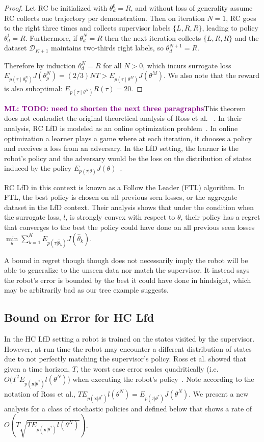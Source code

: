 \documentclass[10pt, conference]{ieeeconf}      %
\newcommand{\bx}{\mathbf{x}}
\newcommand{\mD}{\mathcal{D}}
\newcommand{\mlnote}[1]{\ifthenelse{ \boolean{include-notes}}%
 {\textcolor{purple}{\textbf{ML: #1}}}{}}
\begin{document}
\begin{proof}
Let RC be initialized with $\theta_d^0 = R$, and without loss of generality assume RC collects one trajectory per demonstration.
Then on iteration $N=1$, RC goes to the right three times and collects supervisor labels $\{L, R, R\}$, leading to policy $\theta_{d}^1 = R$.
Furthermore, if $\theta_{d}^N = R$ then the next iteration collects $\{L, R, R\}$ and the dataset $\mD_{K+1}$ maintains two-thirds right labels, so $\theta_{d}^{N+1} = R$.

Therefore by induction $\theta_{d}^{N} = R$ for all $N > 0$, which incurs surrogate loss $E_{p(\tau \mid \theta_{p}^N)} J(\theta_{p}^N) = (2 / 3) N T > E_{p(\tau \mid \theta^M)} J(\theta^M)$.
We also note that the reward is also suboptimal: $E_{p(\tau \mid \theta^N)} R(\tau) = 20$.

\end{proof}

\mlnote{TODO: need to shorten the next three paragraphs}This theorem does not contradict the original theoretical analysis of Ross et al. ~\cite{ross2010reduction}. In their analysis, RC LfD is modeled as an online optimization problem~\cite{ross2010reduction}.  In online optimization a learner plays a game where at each iteration, it chooses a policy and receives a loss from an adversary.  In the LfD setting, the learner is the robot's policy and the adversary would be the loss on the distribution of states induced by the policy $E_{p(\tau|\theta)} J(\theta)$~\cite{shalev2011online}.

RC LfD in this context is known as a Follow the Leader (FTL) algorithm. In FTL, the best policy is chosen on all previous seen losses, or the aggregate dataset in the LfD context. Their analysis shows that under the condition when the surrogate loss, $l$, is strongly convex with respect to $\theta$, their policy has a regret that converges to the best the policy could have done on all previous seen losses $\underset{\theta}{\min} \sum_{k=1}^K E_{p(\tau|\hat{\theta}_k)}J(\hat{\theta}_k)$. 

A bound in regret though though does not necessarily imply the robot will be able to generalize to the unseen data nor match the supervisor. It instead says the robot's error is bounded by the best it could have done in hindsight, which may be arbitrarily bad as our tree example suggests. 

\subsection{Bound on Error for HC Lfd}
In the HC LfD setting a robot is trained on the states visited by the supervisor. However, at run time the robot may encounter a different distribution of states due to not perfectly matching the supervisor's policy. Ross et al. showed that given a time horizon, $T$, the worst case error scales quadritically (i.e. $O(T^2E_{p(\bx|\theta^*)} l(\theta^N)$) when executing the robot's policy~\cite{ross2010efficient}. Note according to the notation of Ross et al., $TE_{p(\bx|\theta^*)} l(\theta^N) = E_{p(\tau|\theta^*)} J(\theta^N)$. We present a new analysis for a class of stochastic policies and  defined below that shows a rate of $O(T\sqrt{TE_{p(\bx|\theta^*)} l(\theta^N)})$.
\end{document}

